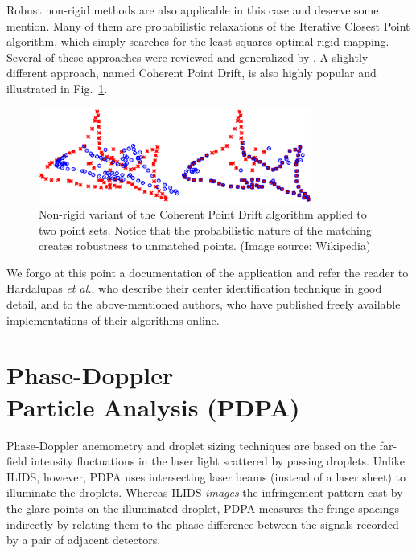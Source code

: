 \documentclass[11.5pt]{book}
\newcommand*{\figref}[1]{Fig.~\ref{#1}}
\begin{document}
Robust non-rigid methods are also applicable in this case and deserve some
mention. Many of them are probabilistic relaxations of the Iterative Closest
Point algorithm, which simply searches for the least-squares-optimal rigid
mapping. Several of these approaches were reviewed and generalized by
\citet{Jian10}. A slightly different approach, named Coherent Point
Drift\cite{Myronenko10}, is also highly popular and illustrated in \figref{fig:cpd}.
\begin{figure}
    \centering
    \includegraphics[width=0.8\textwidth]{img/orb/pointset.eps}
    \caption{Non-rigid variant of the Coherent Point Drift algorithm applied to
    two point sets. Notice that the probabilistic nature of the matching creates
robustness to unmatched points. (Image source: Wikipedia)}
    \label{fig:cpd}
\end{figure}

We forgo at this point a documentation of the application and refer the reader to
Hardalupas \emph{et al.}, who describe their center identification technique in
good detail, and to the above-mentioned authors, who have published freely
available implementations of their algorithms online.


\chapter[Phase-Doppler Particle Analysis]{Phase-Doppler\\Particle Analysis (PDPA)}
Phase-Doppler anemometry and droplet sizing techniques are based on the
far-field intensity fluctuations in the laser light scattered by passing
droplets. Unlike ILIDS, however, PDPA uses intersecting laser beams (instead of
a laser sheet) to illuminate the droplets. Whereas ILIDS \emph{images} the
infringement pattern cast by the glare points on the illuminated droplet, PDPA
measures the fringe spacings indirectly by relating them to the phase difference 
between the signals recorded by a pair of adjacent detectors. 
\end{document}
